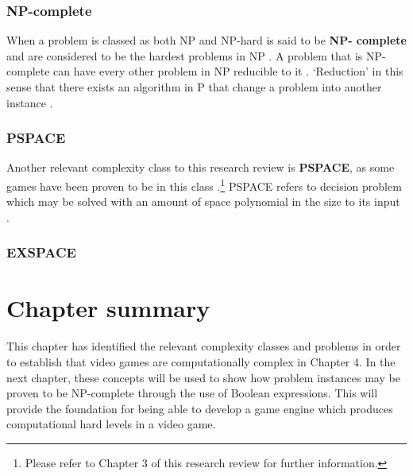 \documentclass[11pt, a4paper, oneside]{report} %
\begin{document}
\subsubsection{NP-complete}

When a problem is classed as both NP and NP-hard is said to be \textbf{NP-
complete} and are considered to be the hardest problems in NP
\cite{sipser2012introduction,Goldreich:2008,kendall2008survey,du2011theory}. A
problem that is NP- complete can have every other problem in NP reducible to it
\cite{papadimitriou2003computational}. `Reduction' in this sense that there
exists an algorithm in P that change a problem into another instance
\cite{du2011theory}.

\subsubsection{PSPACE}

Another relevant complexity class to this research review is \textbf{PSPACE}, as
some games have been proven to be in this class \cite{DBLP:conf/fun/Forisek10,
demaine2002push}.\footnote{Please refer to Chapter 3 of this research review for
further information.} PSPACE refers to decision problem which may be solved with
an amount of space polynomial in the size to its input
\cite{sipser2012introduction}. 

\subsubsection{EXSPACE}


\section{Chapter summary}

This chapter has identified the relevant complexity classes and problems in
order to establish that video games are computationally complex in Chapter 4. In
the next chapter, these concepts will be used to show how problem instances may
be proven to be NP-complete through the use of Boolean expressions. This will
provide the foundation for being able to develop a game engine which produces
computational hard levels in a video game.


\end{document}
